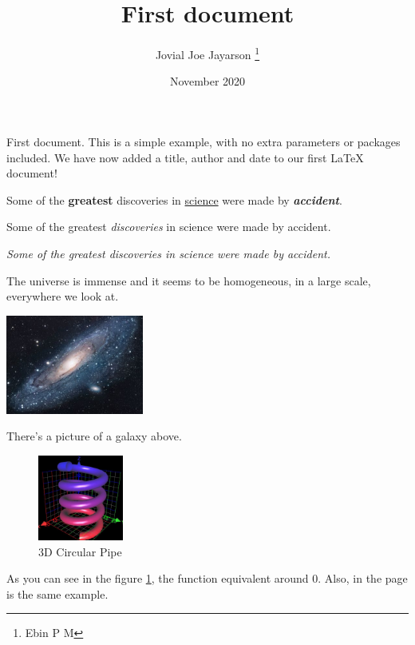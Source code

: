 \documentclass[12pt, a4paper]{article}
\title{First document}
\author{Jovial Joe Jayarson \thanks{Ebin P M}}
\date{November 2020}
\begin{document}
\maketitle %

First document. This is a simple example, with no extra parameters or packages included. We have now added a title, author and date to our first \LaTeX{} document!


Some of the \textbf{greatest} discoveries in \underline{science} were made by \textbf{\textit{accident}}. %

Some of the greatest \emph{discoveries} in science were made by accident.

\textit{Some of the greatest \emph{discoveries} in science were made by accident.}


The universe is immense and it seems to be homogeneous, in a large scale, everywhere we look at.

\includegraphics{universe} %

There's a picture of a galaxy above.

\begin{figure}[h]
    \centering
    \includegraphics[width=0.25\textwidth]{graph}
    \caption{3D Circular Pipe}
    \label{fig:3D Torus}
\end{figure}

As you can see in the figure \ref{fig:3D Torus}, the function equivalent around 0. Also, in the page \pageref{fig:3D Torus} 
is the same example.
\end{document}
